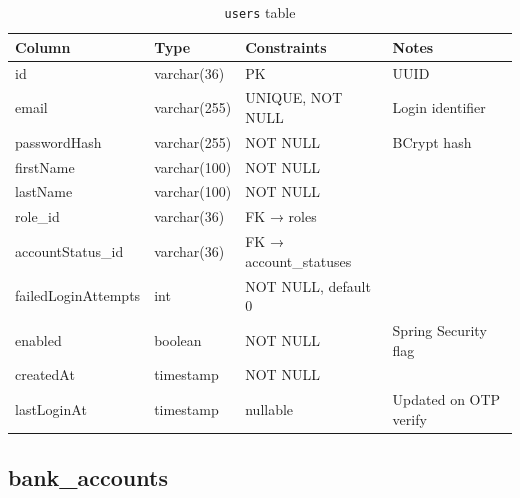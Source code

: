 \documentclass[12pt,a4paper]{report}
\begin{document}
\begin{table}[H]
  \centering
  \caption{\texttt{users} table}
  \begin{tabular}{llll}
    \toprule
    \textbf{Column} & \textbf{Type} & \textbf{Constraints} & \textbf{Notes} \\
    \midrule
    id                    & varchar(36)  & PK              & UUID \\
    email                 & varchar(255) & UNIQUE, NOT NULL & Login identifier \\
    passwordHash          & varchar(255) & NOT NULL         & BCrypt hash \\
    firstName             & varchar(100) & NOT NULL         & \\
    lastName              & varchar(100) & NOT NULL         & \\
    role\_id              & varchar(36)  & FK → roles       & \\
    accountStatus\_id     & varchar(36)  & FK → account\_statuses & \\
    failedLoginAttempts   & int          & NOT NULL, default 0 & \\
    enabled               & boolean      & NOT NULL         & Spring Security flag \\
    createdAt             & timestamp    & NOT NULL         & \\
    lastLoginAt           & timestamp    & nullable         & Updated on OTP verify \\
    \bottomrule
  \end{tabular}
\end{table}

\subsection{bank\_accounts}
\end{document}
